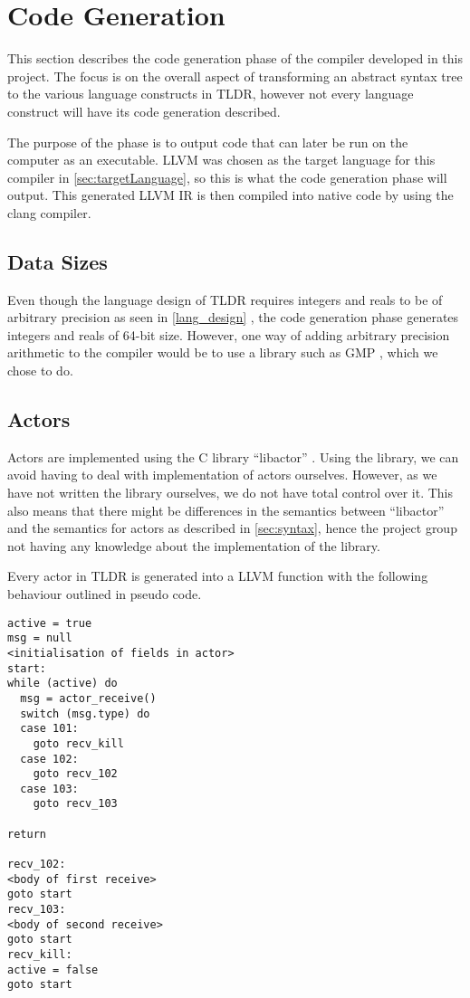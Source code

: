 \section{Code Generation}

This section describes the code generation phase of the compiler developed in this project. The focus is on the overall aspect of transforming an abstract syntax tree to the various language constructs in TLDR, however not every language construct will have its code generation described. 

The purpose of the phase is to output code that can later be run on the computer as an executable. LLVM was chosen as the target language for this compiler in \cref{sec:targetLanguage}, so this is what the code generation phase will output. This generated LLVM IR is then compiled into native code by using the clang compiler.

\subsection{Data Sizes}

Even though the language design of TLDR requires integers and reals to be of arbitrary precision as seen in \cref{lang_design} , the code generation phase generates integers and reals of 64-bit size. However, one way of adding arbitrary precision arithmetic to the compiler would be to use a library such as GMP \cite{gmp}, which we chose to do.

\subsection{Actors}

Actors are implemented using the C library \enquote{libactor} \cite{libactor}. Using the library, we can avoid having to deal with implementation of actors ourselves. However, as we have not written the library ourselves, we do not have total control over it. This also means that there might be differences in the semantics between \enquote{libactor} and the semantics for actors as described in \cref{sec:syntax}, hence the project group not having any knowledge about the implementation of the library.

Every actor in TLDR is generated into a LLVM function with the following behaviour outlined in pseudo code.

\begin{lstlisting}[breaklines]
active = true
msg = null
<initialisation of fields in actor>
start:
while (active) do
  msg = actor_receive()
  switch (msg.type) do
  case 101:
    goto recv_kill
  case 102:
    goto recv_102
  case 103:
    goto recv_103

return

recv_102:
<body of first receive>
goto start 
recv_103:
<body of second receive>
goto start 
recv_kill:
active = false
goto start
\end{lstlisting}

